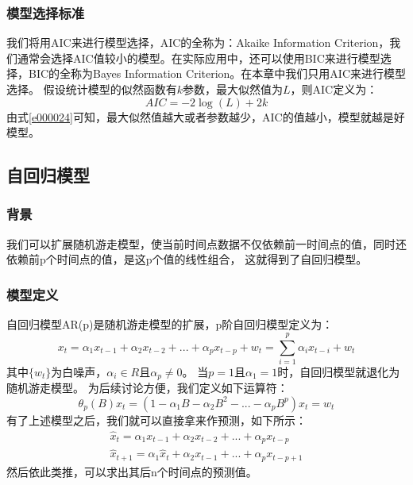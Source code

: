 \documentclass{article}
\begin{document}
\subsubsection{模型选择标准}
我们将用AIC来进行模型选择，AIC的全称为：Akaike Information Criterion，我们通常会选择AIC值较小的模型。在实际应用中，还可以使用BIC来进行模型选择，BIC的全称为Bayes Information Criterion。在本章中我们只用AIC来进行模型选择。\newline
假设统计模型的似然函数有$k$参数，最大似然值为$L$，则AIC定义为：
\begin{equation}
AIC=-2\log(L) + 2k
\label{e000024}
\end{equation}
由式\ref{e000024}可知，最大似然值越大或者参数越少，AIC的值越小，模型就越是好模型。
\subsection{自回归模型}
\subsubsection{背景}
我们可以扩展随机游走模型，使当前时间点数据不仅依赖前一时间点的值，同时还依赖前p个时间点的值，是这p个值的线性组合，
这就得到了自回归模型。
\subsubsection{模型定义}
自回归模型AR(p)是随机游走模型的扩展，p阶自回归模型定义为：
\begin{equation}
x_{t}=\alpha _{1}x_{t-1} + \alpha _{2}x_{t-2} + ... + \alpha _{p}x_{t-p} + w_{t} = \sum_{i=1}^{p} \alpha _{i}x_{t-i} + w_{t}
\label{e000025}
\end{equation}
其中$\{ w_{t} \}$为白噪声，$\alpha _{i} \in R$且$\alpha_{p} \ne 0$。\newline
当$p=1$且$\alpha _{1}=1$时，自回归模型就退化为随机游走模型。\newline
为后续讨论方便，我们定义如下运算符：
\begin{equation}
\theta _{p}(B)x_{t}=(1-\alpha _{1}B-\alpha _{2}B^{2}-...-\alpha _{p}B^{p})x_{t}=w_{t}
\label{e000026}
\end{equation}
有了上述模型之后，我们就可以直接拿来作预测，如下所示：
\begin{equation}
\begin{aligned}
    \hat{x}_t=\alpha _{1}x_{t-1}+\alpha _{2}x_{t-2}+...+\alpha _{p}x_{t-p} \\
    \hat{x}_{t+1}=\alpha _{1}\hat{x}_{t}+\alpha _{2}x_{t-1}+...+\alpha _{p}x_{t-p+1}
\end{aligned}
\label{e000027}
\end{equation}
然后依此类推，可以求出其后n个时间点的预测值。
\end{document}
